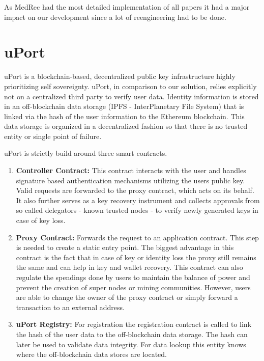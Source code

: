As MedRec had the most detailed implementation of all papers it had a major impact on our development since
a lot of reengineering had to be done.

\section{uPort}
uPort is a blockchain-based, decentralized public key infrastructure highly prioritizing self sovereignty. uPort, in comparison to our solution, relies explicitly not on a centralized third party to verify user data.\cite[p. 2]{uPortWhitePaper}
Identity information is stored in an off-blockchain data storage (IPFS - InterPlanetary File System) that is linked via the hash of the user information to the Ethereum blockchain. This data storage is organized in a decentralized fashion so that there is no trusted entity or single point of failure.

\noindent uPort is strictly build around three smart contracts.
\begin{enumerate}
\item \textbf{Controller Contract:} This contract interacts with the user and handles signature based authentication mechanisms utilizing the users public key. Valid requests are forwarded to the proxy contract, which acts on its behalf. 
It also further serves as a key recovery instrument and collects approvals from so called delegators - known trusted nodes - to verify newly generated keys in case of key loss.

\item \textbf{Proxy Contract:}
Forwards the request to an application contract. This step is needed to create a static entry point.
The biggest advantage in this contract is the fact that in case of key or identity loss the proxy still remains the same and can help in key and wallet recovery.
This contract can also regulate the spendings done by users to maintain the balance of power and prevent the creation of super nodes or mining communities.
However, users are able to change the owner of the proxy contract or simply forward a transaction to an external address\cite[p. 6]{uPortWhitePaper}.

\item \textbf{uPort Registry:}
For registration the registration contract is called to link the hash of the user data to the off-blockchain data storage. The hash can later be used to validate data integrity. 
For data lookup this entity knows where the off-blockchain data stores are located.

\end{enumerate}

